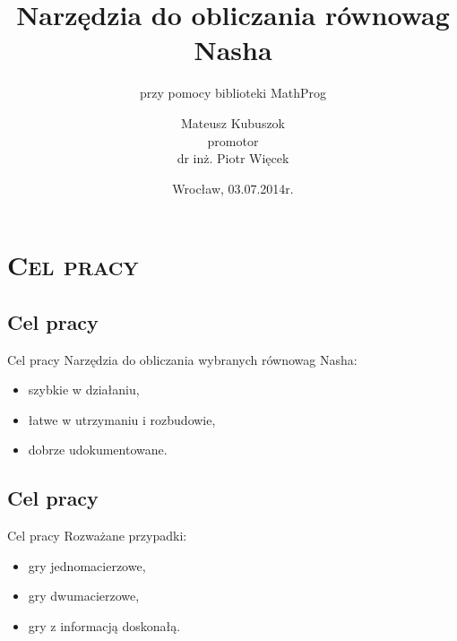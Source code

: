 \documentclass[xcolor=x11names,compress]{beamer}
\renewcommand{\(}{\begin{columns}}
\renewcommand{\)}{\end{columns}}
\newcommand{\<}[1]{\begin{column}{#1}}
\renewcommand{\>}{\end{column}}
\begin{document}
\begin{frame}
\title{Narzędzia do obliczania równowag Nasha}
\subtitle{przy pomocy biblioteki MathProg}
\author[M. Kubuszok]{
  Mateusz Kubuszok\\
  \bigskip
  \tiny{promotor}\\
  \scriptsize{dr inż. Piotr Więcek}\\
}
\date{\tiny{Wrocław, 03.07.2014r.}}
\titlepage
\end{frame}


\section{\scshape Cel pracy}

\subsection{Cel pracy}
\begin{frame}{Cel pracy}
Narzędzia do obliczania wybranych równowag Nasha:
\begin{itemize}
\item szybkie w działaniu,
\item łatwe w utrzymaniu i rozbudowie,
\item dobrze udokumentowane.
\end{itemize}
\end{frame}

\subsection{Cel pracy}
\begin{frame}{Cel pracy}
Rozważane przypadki:
\begin{itemize}
\item gry jednomacierzowe,
\item gry dwumacierzowe,
\item gry z informacją doskonałą.
\end{itemize}
\end{frame}
\end{document}
